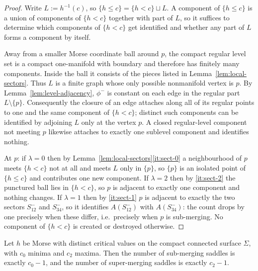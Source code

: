 \begin{proof}
Write $L:=h^{-1}(c)$, so $\{h\le c\}=\{h<c\}\sqcup L$.  A component of
$\{h\le c\}$ is a union of components of $\{h<c\}$ together with part of $L$,
so it suffices to determine which components of $\{h<c\}$ get identified and
whether any part of $L$ forms a component by itself.

Away from a smaller Morse coordinate ball around $p$, the compact regular
level set is a compact one-manifold with boundary and therefore has finitely
many components.  Inside the ball it consists of the pieces listed in
Lemma~\ref{lem:local-sectors}.  Thus $L$ is a finite graph whose only possible
nonmanifold vertex is $p$.  By Lemma~\ref{lem:level-adjacency}, $\phi^-$ is
constant on each edge in the regular part $L\setminus\{p\}$.  Consequently the
closure of an edge attaches along all of its regular points to one and the
same component of $\{h<c\}$; distinct such components can be identified by
adjoining $L$ only at the vertex $p$.  A closed regular-level component not
meeting $p$ likewise attaches to exactly one sublevel component and identifies
nothing.

At $p$: if $\lambda=0$ then by
Lemma~\ref{lem:local-sectors}\ref{it:sect-0} a neighbourhood of $p$ meets
$\{h<c\}$ not at all and meets $L$ only in $\{p\}$, so $\{p\}$ is an isolated
point of $\{h\le c\}$ and contributes one new component.  If $\lambda=2$ then
by \ref{it:sect-2} the punctured ball lies in $\{h<c\}$, so $p$ is adjacent to
exactly one component and nothing changes.  If $\lambda=1$ then by
\ref{it:sect-1} $p$ is adjacent to exactly the two sectors $S^-_{12}$ and
$S^-_{34}$, so it identifies $A(S^-_{12})$ with $A(S^-_{34})$: the count drops
by one precisely when these differ, i.e.\ precisely when $p$ is sub-merging.
No component of $\{h<c\}$ is created or destroyed otherwise.
\end{proof}

\begin{lemma}\label{lem:count-submerging}
Let $h$ be Morse with distinct critical values on the compact connected
surface $\Sigma$, with $c_0$ minima and $c_2$ maxima.  Then the number of
sub-merging saddles is exactly $c_0-1$, and the number of super-merging
saddles is exactly $c_2-1$.
\end{lemma}

